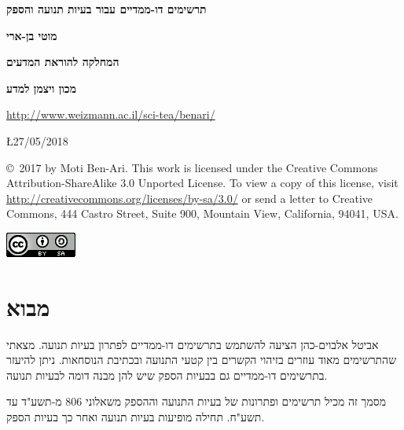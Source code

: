 \documentclass[12pt,a4paper]{article}
\begin{document}
\thispagestyle{empty}


\begin{center}
\textbf{\LARGE תרשימים דו-ממדיים עבור בעיות תנועה והספק}

\bigskip
\bigskip

\textbf{\Large מוטי בן-ארי}

\bigskip

\textbf{\large המחלקה להוראת המדעים}

\bigskip

\textbf{\large מכון ויצמן למדע}

\bigskip

\url{http://www.weizmann.ac.il/sci-tea/benari/}

\bigskip

\L{27/05/2018}

\end{center}


\begin{footnotesize}
\copyright{}\  2017 by Moti Ben-Ari. This work is licensed under the Creative Commons Attribution-ShareAlike 3.0 Unported License. To view a copy of this license, visit \url{http://creativecommons.org/licenses/by-sa/3.0/} or send a letter to Creative Commons, 444 Castro Street, Suite 900, Mountain View, California, 94041, USA.
\end{footnotesize}

\bigskip

\begin{center}
\includegraphics[width=.15\textwidth]{../by-sa.png}
\end{center}


\section*{מבוא}

אביטל אלבוים-כהן הציעה להשתמש בתרשימים דו-ממדיים לפתרון בעיות תנועה. מצאתי שהתרשימים מאוד עוזרים בזיהוי הקשרים בין קטעי התנועה ובכתיבת הנוסחאות. ניתן להיעזר בתרשימים דו-ממדיים גם בבעיות הספק שיש להן מבנה דומה לבעיות תנועה.

\smallskip

מסמך זה מכיל תרשימים ופתרונות של בעיות התנועה וההספק משאלוני
$806$
מ-תשע"ד עד תשע"ח. תחילה מופיעות בעיות תנועה ואחר כך בעיות הספק.
\end{document}
